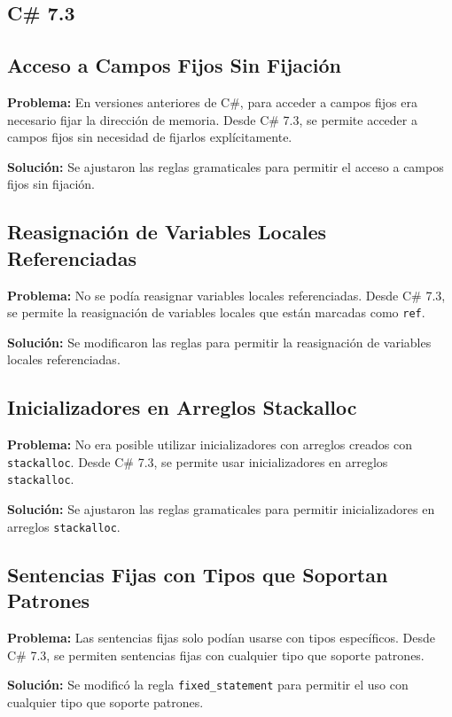 \subsection*{C\# 7.3}

\subsection*{Acceso a Campos Fijos Sin Fijación}
\textbf{Problema:} En versiones anteriores de C\#, para acceder a campos fijos era necesario fijar la dirección de memoria. Desde C\# 7.3, se permite acceder a campos fijos sin necesidad de fijarlos explícitamente.

\textbf{Solución:} Se ajustaron las reglas gramaticales para permitir el acceso a campos fijos sin fijación.

\subsection*{Reasignación de Variables Locales Referenciadas}
\textbf{Problema:} No se podía reasignar variables locales referenciadas. Desde C\# 7.3, se permite la reasignación de variables locales que están marcadas como \texttt{ref}.

\textbf{Solución:} Se modificaron las reglas para permitir la reasignación de variables locales referenciadas.

\subsection*{Inicializadores en Arreglos Stackalloc}
\textbf{Problema:} No era posible utilizar inicializadores con arreglos creados con \texttt{stackalloc}. Desde C\# 7.3, se permite usar inicializadores en arreglos \texttt{stackalloc}.

\textbf{Solución:} Se ajustaron las reglas gramaticales para permitir inicializadores en arreglos \texttt{stackalloc}.

\subsection*{Sentencias Fijas con Tipos que Soportan Patrones}
\textbf{Problema:} Las sentencias fijas solo podían usarse con tipos específicos. Desde C\# 7.3, se permiten sentencias fijas con cualquier tipo que soporte patrones.

\textbf{Solución:} Se modificó la regla \texttt{fixed\_statement} para permitir el uso con cualquier tipo que soporte patrones.

